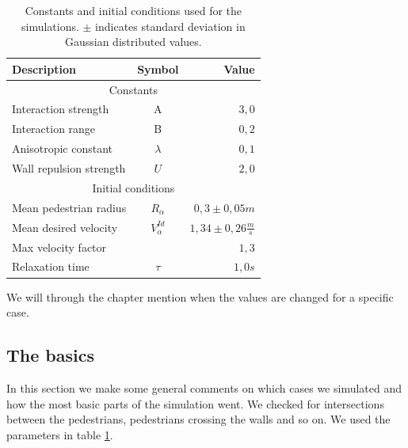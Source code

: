 \begin{table}[ht]
    \begin{center}
        \begin{tabular}{l c r}
            \toprule
            \textbf{Description} & \textbf{Symbol} & \textbf{Value} \\
            \midrule
            \multicolumn{3}{c}{\textsf{Constants}}\\
            Interaction strength & A & $3,0$ \\
            Interaction range & B & $0,2$ \\
            Anisotropic constant & $\lambda$ & $0,1$ \\
            Wall repulsion strength & $U$ &  $2,0$ \\
            \midrule
            \multicolumn{3}{c}{\textsf{Initial conditions}}\\
            Mean pedestrian radius & $R_\alpha$ & $0,3 \pm 0,05 m$\\
            Mean desired velocity &  $V^{Id}_\alpha$ &  $1,34 \pm 0,26
            \frac{m}{s}$ \\
            Max velocity factor &  &  $1,3$ \\
            Relaxation time & $\tau$ & $1,0 s$\\
            \bottomrule
        \end{tabular}
        \caption[Constants and initial conditions]{Constants and initial
        conditions used for the simulations. $\pm$ indicates standard
        deviation in Gaussian distributed values.}
        \label{tbl:parameter-settings}
    \end{center}
\end{table}

We will through the chapter mention when the values are changed for a
specific case.

\subsection{The basics}
In this section we make some general comments on which cases we simulated
and how the most basic parts of the simulation went. We checked for
intersections between the pedestrians, pedestrians crossing the walls
and so on. We used the parameters in table \ref{tbl:parameter-settings}.

